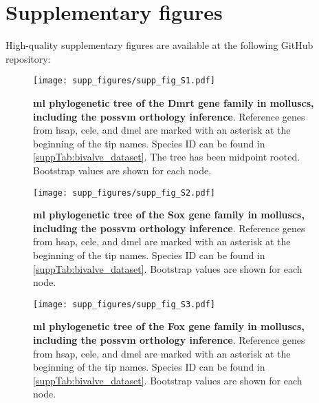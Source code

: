 
% 

{
\chapter*{Supplementary figures}
\label{supp_fig}
}

High-quality supplementary figures are available at the following GitHub repository:


\setcounter{figure}{0}
\renewcommand{\figurename}{Supplementary Figure}
\renewcommand{\thefigure}{\textbf{S\arabic{figure}}}

\begin{figure}[ht]
	\centering
	\texttt{[image: supp\_figures/supp\_fig\_S1.pdf]}
	\caption[\textbf{\gls{ml} phylogenetic tree of the Dmrt gene family in molluscs, including the possvm orthology inference}]
	{
		\textbf{\gls{ml} phylogenetic tree of the Dmrt gene family in molluscs, including the possvm orthology inference}. Reference genes from \gls{hsap}, \gls{cele}, and \gls{dmel} are marked with an asterisk at the beginning of the tip names. Species ID can be found in \cref{suppTab:bivalve_dataset}. The tree has been midpoint rooted. Bootstrap values are shown for each node.
	}
	\label{suppFig:dmrt_bivalves}
\end{figure}

\begin{figure}[ht]
	\centering
	\texttt{[image: supp\_figures/supp\_fig\_S2.pdf]}
	\caption[\textbf{\gls{ml} phylogenetic tree of the Sox gene family in molluscs, including the possvm orthology inference}]
	{
		\textbf{\gls{ml} phylogenetic tree of the Sox gene family in molluscs, including the possvm orthology inference}. Reference genes from \gls{hsap}, \gls{cele}, and \gls{dmel} are marked with an asterisk at the beginning of the tip names. Species ID can be found in \cref{suppTab:bivalve_dataset}. Bootstrap values are shown for each node.
	}
	\label{suppFig:sox_bivalves}
\end{figure}

\begin{figure}[ht]
	\centering
	\texttt{[image: supp\_figures/supp\_fig\_S3.pdf]}
	\caption[\textbf{\gls{ml} phylogenetic tree of the Fox gene family in molluscs, including the possvm orthology inference}]
	{
		\textbf{\gls{ml} phylogenetic tree of the Fox gene family in molluscs, including the possvm orthology inference}. Reference genes from \gls{hsap}, \gls{cele}, and \gls{dmel} are marked with an asterisk at the beginning of the tip names. Species ID can be found in \cref{suppTab:bivalve_dataset}. Bootstrap values are shown for each node.
	}
	\label{suppFig:fox_bivalves}
\end{figure}

